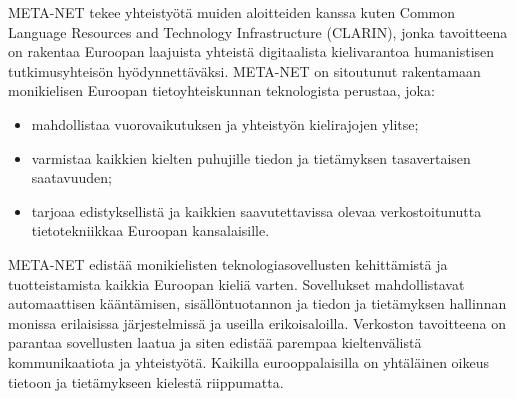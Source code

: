 \documentclass[]{../../metanetpaper}
\begin{document}
\begin{Parallel}[c]{70mm}{70mm}
{META-NET tekee yhteistyötä muiden aloitteiden kanssa kuten Common
Language Resources and Technology Infrastructure (CLARIN), jonka
tavoitteena on rakentaa Euroopan laajuista yhteistä digitaalista
kielivarantoa humanistisen tutkimusyhteisön hyödynnettäväksi. META-NET
on sitoutunut rakentamaan monikielisen Euroopan tietoyhteiskunnan
teknologista perustaa, joka:
\begin{itemize}
\item mahdollistaa vuorovaikutuksen ja yhteistyön kielirajojen ylitse;

\item varmistaa kaikkien kielten puhujille tiedon ja tietämyksen
    tasavertaisen saatavuuden;

\item tarjoaa edistyksellistä ja kaikkien saavutettavissa olevaa
    verkostoitunutta tietotekniikkaa Euroopan kansalaisille.
\end{itemize}

META-NET edistää monikielisten teknologiasovellusten kehittämistä ja
tuotteistamista kaikkia Euroopan kieliä varten. Sovellukset
mahdollistavat automaattisen kääntämisen, sisällöntuotannon ja tiedon
ja tietämyksen hallinnan monissa erilaisissa järjestelmissä ja useilla
erikoisaloilla. Verkoston tavoitteena on parantaa sovellusten laatua
ja siten edistää parempaa kieltenvälistä kommunikaatiota ja
yhteistyötä. Kaikilla eurooppalaisilla on yhtäläinen oikeus tietoon ja
tietämykseen kielestä riippumatta.
}

\end{Parallel}
\end{document}
